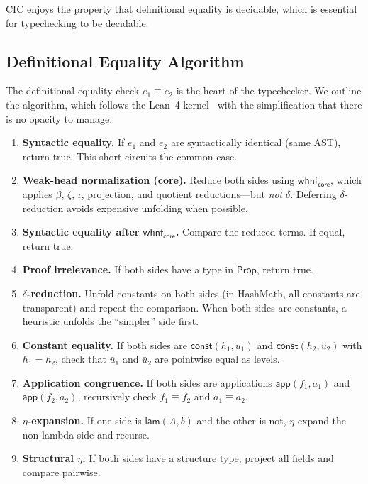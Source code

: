 \documentclass[11pt]{article}
\theoremstyle{definition}
\theoremstyle{plain}
\theoremstyle{remark}
\newcommand{\Prop}{\textsf{Prop}}
\newcommand{\const}{\textsf{const}}
\newcommand{\app}{\textsf{app}}
\newcommand{\lam}{\textsf{lam}}
\newcommand{\whnf}{\textsf{whnf}}
\begin{document}
CIC enjoys the property that definitional equality is decidable, which is essential for
typechecking to be decidable.

\subsection{Definitional Equality Algorithm}
\label{sec:defeq}

The definitional equality check $e_1 \equiv e_2$ is the heart of the typechecker.
We outline the algorithm, which follows the Lean~4 kernel~\cite{lean4} with the
simplification that there is no opacity to manage.

\begin{enumerate}[nosep]
  \item \textbf{Syntactic equality.}
        If $e_1$ and $e_2$ are syntactically identical (same AST), return true.
        This short-circuits the common case.

  \item \textbf{Weak-head normalization (core).}
        Reduce both sides using $\whnf_{\textsf{core}}$, which applies $\beta$, $\zeta$, $\iota$, projection, and quotient reductions---but \emph{not} $\delta$.
        Deferring $\delta$-reduction avoids expensive unfolding when possible.

  \item \textbf{Syntactic equality after $\whnf_{\textsf{core}}$.}
        Compare the reduced terms. If equal, return true.

  \item \textbf{Proof irrelevance.}
        If both sides have a type in $\Prop$, return true.

  \item \textbf{$\delta$-reduction.}
        Unfold constants on both sides (in HashMath, all constants are transparent) and repeat the comparison.
        When both sides are constants, a heuristic unfolds the ``simpler'' side first.

  \item \textbf{Constant equality.}
        If both sides are $\const(h_1, \bar{u}_1)$ and $\const(h_2, \bar{u}_2)$ with $h_1 = h_2$, check that $\bar{u}_1$ and $\bar{u}_2$ are pointwise equal as levels.

  \item \textbf{Application congruence.}
        If both sides are applications $\app(f_1, a_1)$ and $\app(f_2, a_2)$,
        recursively check $f_1 \equiv f_2$ and $a_1 \equiv a_2$.

  \item \textbf{$\eta$-expansion.}
        If one side is $\lam(A, b)$ and the other is not, $\eta$-expand the non-lambda side and recurse.

  \item \textbf{Structural $\eta$.}
        If both sides have a structure type, project all fields and compare pairwise.
\end{enumerate}
\end{document}
